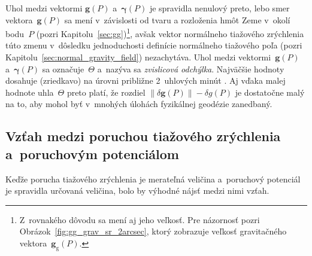 \documentclass[a4paper, 12pt]{book}
\newcommand{\gidx}{\mathrm g}
\let\vec\mathbf
\begin{document}
Uhol medzi vektormi $\vec g(P)$ a~$\boldsymbol{\gamma}(P)$ je spravidla 
nenulový preto, lebo smer vektora~$\vec g(P)$ sa mení v~závislosti od tvaru 
a rozloženia hmôt Zeme v~okolí bodu~$P$ (pozri 
Kapitolu~\ref{sec:gg})\footnote{Z~rovnakého dôvodu sa mení aj jeho veľkosť.  
Pre názornosť pozri Obrázok~\ref{fig:gg_grav_sr_2arcsec}, ktorý zobrazuje 
veľkosť gravitačného vektora~$\vec g_\gidx(P)$.}, avšak vektor normálneho 
tiažového zrýchlenia túto zmenu v~dôsledku jednoduchosti definície normálneho 
tiažového poľa (pozri Kapitolu~\ref{sec:normal_gravity_field}) nezachytáva.  
Uhol medzi vektormi~$\vec g(P)$ a~$\boldsymbol \gamma(P)$ sa označuje~$\Theta$ 
a~nazýva sa \emph{zvislicová odchýlka}.  Najväčšie hodnoty dosahuje (zriedkavo) 
na úrovni približne 2~uhlových minút \parencite{GGMplus}.  Aj vďaka malej 
hodnote uhla~$\Theta$ preto platí, že rozdiel $\| \delta \vec g(P) \| - \delta 
g(P)$ je dostatočne malý na to, aby mohol byť v~mnohých úlohách fyzikálnej 
geodézie zanedbaný.


\subsection{Vzťah medzi poruchou tiažového zrýchlenia a~poruchovým potenciálom}

Keďže porucha tiažového zrýchlenia je merateľná veličina a~poruchový potenciál 
je spravidla určovaná veličina, bolo by výhodné nájsť medzi nimi vzťah.
\end{document}
